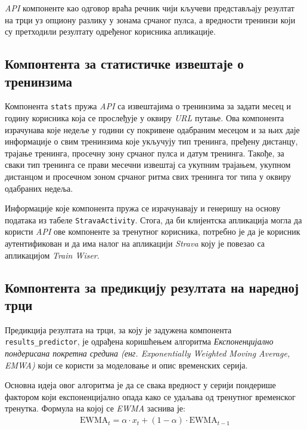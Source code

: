\documentclass[12pt,oneside]{memoir}
\begin{document}
\textit{API} компоненте као одговор враћа речник чији кључеви представљају резултат на трци уз опциону разлику у зонама срчаног пулса, а вредности тренинзи који су претходили резултату одређеног корисника апликације.


\subsection{Компонтента за статистичке извештаје о тренинзима}

Компонента \texttt{stats} пружа \textit{API} са извештајима о тренинзима за задати месец и годину корисника која се прослеђује у оквиру \textit{URL} путање. Ова компонента израчунава које недеље у години су покривене одабраним месецом и за њих даје информације о свим тренинзима које укључују тип тренинга, пређену дистанцу, трајање тренинга, просечну зону срчаног пулса и датум тренинга. Такође, за сваки тип тренинга се прави месечни извештај са укупним трајањем, укупном дистанцом и просечном зоном срчаног ритма свих тренинга тог типа у оквиру одабраних недеља.

Информације које компонента пружа се израчунавају и генеришу на основу података из табеле \texttt{StravaActivity}. Стога, да би клијентска апликација могла да користи \textit{API} ове компоненте за тренутног корисника, потребно је да је корисник аутентификован и да има налог на апликацији \textit{Strava} коју је повезао са апликацијом \textit{Train Wiser}. 

\subsection{Компонтента за предикцију резултата на наредној трци}

Предикција резултата на трци, за коју је задужена компонента \\
\texttt{results\_predictor}, је одрађена коришћењем алгоритма \textit{Експоненцијално пондерисана покретна средина (енг. Exponentially Weighted Moving Average, EMWA)} \cite{ewma} који се користи за моделовање и опис временских серија. 

Основна идеја овог алгоритма је да се свака вредност у серији пондерише фактором који експоненцијално опада како се удаљава од тренутног временског тренутка. Формула на којој се \textit{EWMA} заснива је:
\[
\begin{aligned}
\text{EWMA}_t = \alpha \cdot x_t + (1 - \alpha) \cdot \text{EWMA}_{t-1}
\end{aligned}
\]
\end{document}
